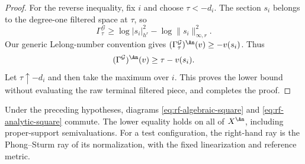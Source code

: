 \begin{proof}
For the reverse inequality, fix $i$ and choose $\tau<-d_i$. The section $s_i$ belongs to the degree-one filtered space at $\tau$, so
\[
 \Gamma^{\mathcal G}_\tau
     \geq\log|s_i|_{h^r}^2-\log\|s_i\|_{\infty,r}^2.
\]
Our generic Lelong-number convention gives
$(\Gamma^{\mathcal G}_\tau)^{\An}(v)\geq-v(s_i)$. Thus
\[
 (\Gamma^{\mathcal G})^{\An}(v)\geq\tau-v(s_i).
\]
Let $\tau\uparrow-d_i$ and then take the maximum over $i$. This proves the lower bound without evaluating the raw terminal filtered piece, and completes the proof.
\end{proof}

\noindent\begin{minipage}{\linewidth}
\begin{theorem}\label{thm:rf-commutativity}
Under the preceding hypotheses, diagrams \eqref{eq:rf-algebraic-square} and \eqref{eq:rf-analytic-square} commute. The lower equality holds on all of $X^{\An}$, including proper-support semivaluations. For a test configuration, the right-hand ray is the Phong--Sturm ray of its normalization, with the fixed linearization and reference metric.
\end{theorem}
\end{minipage}\par

